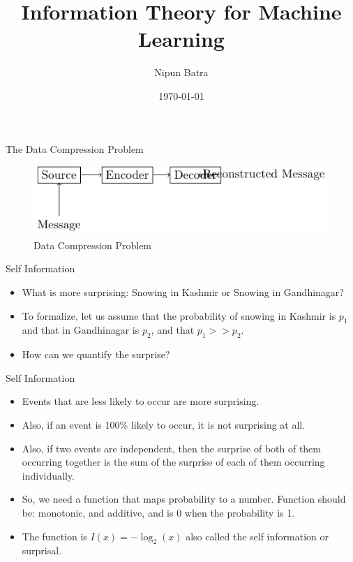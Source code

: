 \documentclass[handout]{beamer}
\begin{document}
\title{Information Theory for Machine Learning}
\author{Nipun Batra}
\date{\today}
\maketitle


\begin{frame}{The Data Compression Problem}
    \begin{figure}[h]
        \centering
        \includegraphics{../diagrams/information-compression.pdf}
        \caption{Data Compression Problem}
      \end{figure}
    
\end{frame}


\begin{frame}{Self Information}
\begin{itemize}
    \item What is more surprising: Snowing in Kashmir or Snowing in Gandhinagar?
    \item To formalize, let us assume that the probability of snowing in Kashmir is $p_1$ and that in Gandhinagar is $p_2$, and that $p_1 >> p_2$.
    \item How can we quantify the surprise?
\end{itemize}
\end{frame}

\begin{frame}{Self Information}
    \begin{itemize}
        \item Events that are less likely to occur are more surprising.
        \item Also, if an event is 100\% likely to occur, it is not surprising at all.
        \item Also, if two events are independent, then the surprise of both of them occurring together is the sum of the surprise of each of them occurring individually.
        \item So, we need a function that maps probability to a number. Function  should be: monotonic, and additive, and is 0 when the probability is 1.
        \item The function is $I(x) = -\log_2(x)$ also called the self information or surprisal.
    \end{itemize}
    \end{frame}
\end{document}
